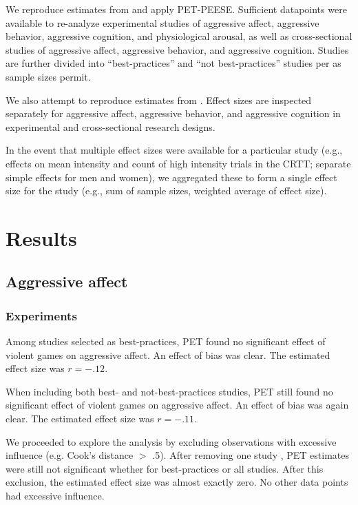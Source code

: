 \documentclass[man]{apa6}
\begin{document}
We reproduce estimates from \citet{Anderson:etal:2010} and apply PET-PEESE. Sufficient datapoints were available to re-analyze experimental studies of aggressive affect, aggressive behavior, aggressive cognition, and physiological arousal, as well as cross-sectional studies of aggressive affect, aggressive behavior, and aggressive cognition. Studies are further divided into ``best-practices'' and ``not best-practices'' studies per \citet{Anderson:etal:2010} as sample sizes permit. 

We also attempt to reproduce estimates from \citet{Greitemeyer:Mugge:2014}. Effect sizes are inspected separately for aggressive affect, aggressive behavior, and aggressive cognition in experimental and cross-sectional research designs.

In the event that multiple effect sizes were available for a particular study (e.g., effects on mean intensity and count of high intensity trials in the CRTT; separate simple effects for men and women), we aggregated these to form a single effect size for the study (e.g., sum of sample sizes, weighted average of effect size).

\section{Results}
\subsection{Aggressive affect}
\subsubsection{Experiments}
Among studies selected as best-practices, PET found no significant effect of violent games on aggressive affect. An effect of bias was clear. The estimated effect size was $r = -.12$.

When including both best- and not-best-practices studies, PET still found no significant effect of violent games on aggressive affect. An effect of bias was again clear. The estimated effect size was $r = -.11$.

We proceeded to explore the analysis by excluding observations with excessive influence (e.g. Cook's distance $>$ .5). After removing one study \citep{Ballard:Weist:1996}, PET estimates were still not significant whether for best-practices or all studies. After this exclusion, the estimated effect size was almost exactly zero. No other data points had excessive influence. 
\end{document}
